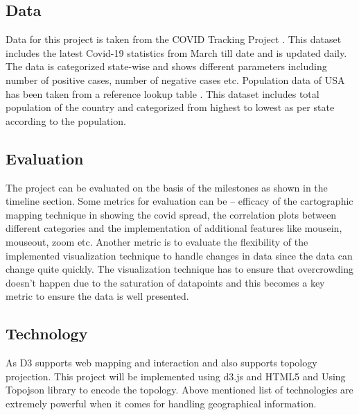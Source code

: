 \subsection{Data}
\label{sec:data}

Data for this project is taken from the COVID Tracking Project \cite{CTP}. This dataset includes the latest Covid-19 statistics from March till date and is updated daily. The data is categorized state-wise and shows different parameters including number of positive cases, number of negative cases etc. Population data of USA has been taken from a reference lookup table \cite{PopData}. This dataset includes total population of the country and categorized from highest to lowest as per state according to the population. 

\subsection{Evaluation}
\label{sec:eval}

The project can be evaluated on the basis of the milestones as shown in the timeline section. Some metrics for evaluation can be – efficacy of the cartographic mapping technique in showing the covid spread, the correlation plots between different categories and the implementation of additional features like mousein, mouseout, zoom etc.
Another metric is to evaluate the flexibility of the implemented visualization technique to handle changes in data since the data can change quite quickly. The visualization technique has to ensure that overcrowding doesn’t happen due to the saturation of datapoints and this becomes a key metric to ensure the data is well presented.

\subsection{Technology}
\label{sec:tech}

As D3 \cite{d3js} supports web mapping and interaction and also supports topology projection. This project will be implemented using d3.js and HTML5 and Using Topojson library \cite{top} to encode the topology. 
Above mentioned list of technologies are extremely powerful when it comes for handling geographical information. 

